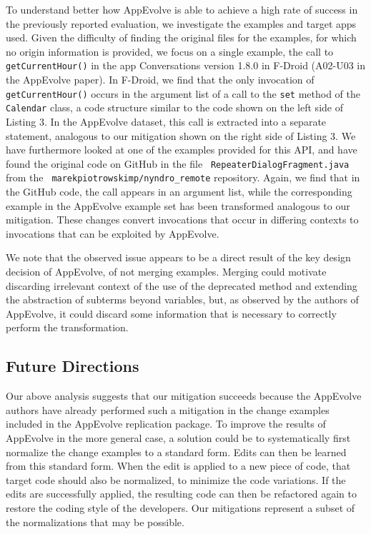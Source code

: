 To understand better how AppEvolve is able to achieve a high rate of
success in the previously reported evaluation, we investigate the examples
and target apps used.  Given the difficulty of finding the original files
for the examples, for which no origin information is provided, we focus on
a single example, the call to {\tt getCurrentHour()} in the app {\sc
  Conversations} version 1.8.0 in F-Droid (A02-U03 in the AppEvolve paper).
In F-Droid, we find that the only invocation of {\tt getCurrentHour()}
occurs in the argument list of a call to the {\tt set} method of the {\tt
  Calendar} class, a code structure similar to the code shown on the left
side of Listing 3.  In the AppEvolve dataset, this call is extracted into a
separate statement, analogous to our mitigation shown on the right side of
Listing 3.  We have furthermore looked at one of the examples provided for
this API, and have found the original code on GitHub in the file {\tt
  RepeaterDialogFragment.java} from the {\tt
  marekpiotrowskimp/nyndro\_remote} repository.  Again, we find that in the
GitHub code, the call appears in an argument list, while the corresponding
example in the AppEvolve example set has been transformed analogous to our
mitigation.  These changes convert invocations that occur in differing
contexts to invocations that can be exploited by AppEvolve.

We note that the observed issue appears to be a direct result of the key
design decision of AppEvolve, of not merging examples.  Merging could
motivate discarding irrelevant context of the use of the deprecated method
and extending the abstraction of subterms beyond variables, but, as observed
by the authors of AppEvolve, it could discard some information
that is necessary to correctly perform the transformation.

\subsection{Future Directions}

Our above analysis suggests that our mitigation succeeds because the
AppEvolve authors have already performed such a mitigation in the change
examples included in the AppEvolve replication package.  To improve the
results of AppEvolve in the more general case, a solution could be to
systematically first normalize the change examples to a standard form.
Edits can then be learned from this standard form. When the edit is applied
to a new piece of code, that target code should also be normalized, to
minimize the code variations. If the edits are successfully applied, the
resulting code can then be refactored again to restore the coding style of
the developers.  Our mitigations represent a subset of the normalizations
that may be possible.

